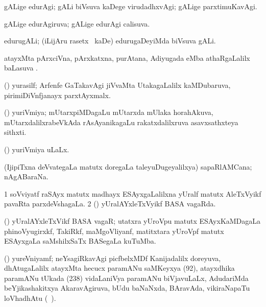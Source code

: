 \bentry
{} 
\gl{\kirxvi}
\expl{}
\bmng
gALige edurAgi; gALi biVsuva kaDege virudadhxvAgi; gALige parxtimuKavAgi. 
\emng
\eentry

\bentry
{} 
\gl{\gu}
\expl{}
\bmng
gALige edurAgiruva; gALige edurAgi calisuva. 
\emng
\eentry

\bentry
{} 
\gl{\nA}
\expl{}
\bmng
edurugALi; (iLijAru rasetx \mo\ kaDe) edurugaDeyiMda biVsuva gALi. 
\emng
\eentry

\bentry
{} 
\gl{\sapUpa}
\expl{}
\bmng
atayxMta pArxciVna, pArxkatxna, purAtana, Adiyugada eMba athaRgaLalilx baLasuva \sapUpa. 
\emng
\eentry

\bentry
{} 
\gl{\nA}
\expl{}
\bmng
(\jiVra) yurasilf; Arfenfe GaTakavAgi jiVvaMta UtakagaLalilx kaMDubaruva, pirimiDiVnfjanayx parxtAyxmalx. 
\emng
\eentry

\bentry
{} 
\gl{\nA}
\expl{}
\bmng
(\roVshA) yuriVmiya; mUtarxpiMDagaLu mUtarxda mUlaka horahAkuva, mUtarxdalilxrabeVkAda rAsAyanikagaLu rakatxdalilxruva asavxsathxteya sithxti. 
\emng
\eentry

\bentry
{} 
\gl{\gu}
\bmng
(\roVshA) yuriVmiya uLaLx. 
\emng
\eentry

{} 
\gl{\nA}
\expl{}
\bmng
(IjipiTxna deVvategaLa matutx doregaLa taleyuDugeyalilxya) sapaRlAMCana; nAgABaraNa.  
\emng
\eentry

\bentry
{} 
\gl{\gu}
\expl{}
\bmng
\bnum
\num{1} soVviyatf raSAyx matutx madhayx ESAyxgaLalilxna yUralf matutx AleTxVyikf pavaRta parxdeVshagaLa. 
\num{2} (\BAshA) yUralAYxleTxVyikf BASA vagaRda. 
\enum
\emng
\eentry

\bentry
{} 
\gl{\nA}
\expl{}
\bmng
(\BAshA) yUralAYxleTxVikf BASA vagaR; utatxra yUroVpu matutx ESAyxKaMDagaLa phinoVyugirxkf, TakiRkf, maMgoVliyanf, matitxtara yUroVpf matutx ESAyxgaLa saMshilxSaTx BASegaLa kuTuMba. 
\emng
\eentry

\bentry
{} 
\gl{\nA}
\expl{}
\bmng
(\ravi) yureVniyamf; neYsagiRkavAgi picfbelxMDf Kanijadalilx doreyuva, dhAtugaLalilx atayxMta hecucx paramANu saMKeyxya (92), atayxdhika paramANu tUkada (238) vidaLaniVya paramANu biVjavuLaLx, AdudariMda beYjikashakitxya AkaravAgiruva, bUdu baNaNxda, BAravAda, vikiraNapaTu loVhadhAtu (\saMkeV\ ). 
\emng
\eentry

